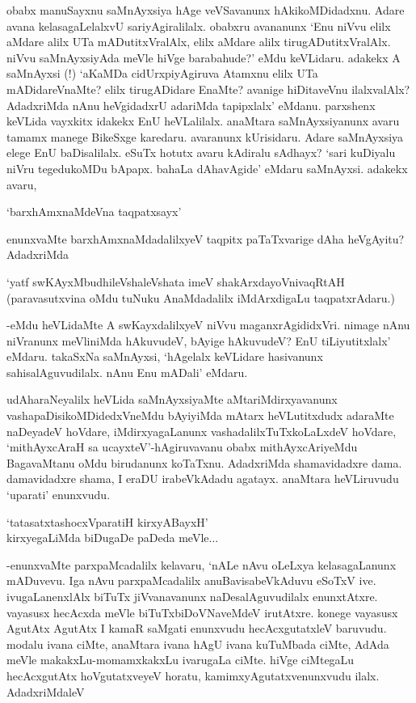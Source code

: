 obabx manuSayxnu saMnAyxsiya hAge veVSavanunx hAkikoMDidadxnu. Adare avana kelasagaLelalxvU sariyAgiralilalx. obabxru avananunx `Enu niVvu elilx aMdare alilx UTa mADutitxVralAlx, elilx aMdare alilx tirugADutitxVralAlx. niVvu saMnAyxsiyAda meVle hiVge barabahude?' eMdu keVLidaru. adakekx A saMnAyxsi (!) `aKaMDa cidUrxpiyAgiruva Atamxnu elilx UTa mADidareVnaMte? elilx tirugADidare EnaMte? avanige hiDitaveVnu ilalxvalAlx? AdadxriMda nAnu heVgidadxrU adariMda tapipxlalx' eMdanu. parxshenx keVLida vayxkitx idakekx EnU heVLalilalx. anaMtara saMnAyxsiyanunx avaru tamamx manege BikeSxge karedaru. avaranunx kUrisidaru. Adare saMnAyxsiya elege EnU baDisalilalx. eSuTx hotutx avaru kAdiralu sAdhayx? `sari kuDiyalu niVru tegedukoMDu bApapx. bahaLa dAhavAgide' eMdaru saMnAyxsi. adakekx avaru,

\begin{shloka}
`barxhAmxnaMdeVna taqpatxsayx'
\end{shloka}

enunxvaMte barxhAmxnaMdadalilxyeV taqpitx paTaTxvarige dAha heVgAyitu? AdadxriMda

\begin{shloka}
`yatf swKAyxMbudhileVshaleVshata imeV shakArxdayoVnivaqRtAH\\
(paravasutxvina oMdu tuNuku AnaMdadalilx iMdArxdigaLu taqpatxrAdaru.)
\end{shloka}

-eMdu heVLidaMte A swKayxdalilxyeV niVvu maganxrAgididxVri. nimage nAnu niVranunx meVliniMda hAkuvudeV, bAyige hAkuvudeV? EnU tiLiyutitxlalx' eMdaru. takaSxNa saMnAyxsi, `hAgelalx keVLidare hasivanunx sahisalAguvudilalx. nAnu Enu mADali' eMdaru.

udAharaNeyalilx heVLida saMnAyxsiyaMte aMtariMdirxyavanunx vashapaDisikoMDidedxVneMdu bAyiyiMda mAtarx heVLutitxdudx adaraMte naDeyadeV hoVdare, iMdirxyagaLanunx vashadalilxTuTxkoLaLxdeV hoVdare, `mithAyxcAraH sa ucayxteV'-hAgiruvavanu obabx mithAyxcAriyeMdu BagavaMtanu oMdu birudanunx koTaTxnu. AdadxriMda shamavidadxre dama. damavidadxre shama, I eraDU irabeVkAdadu agatayx. anaMtara heVLiruvudu `uparati' enunxvudu.

\begin{shloka}
`tatasatxtashocxVparatiH kirxyABayxH'\\
kirxyegaLiMda biDugaDe paDeda meVle$\ldots$ 
\end{shloka}

-enunxvaMte parxpaMcadalilx kelavaru, `nALe nAvu oLeLxya kelasagaLanunx mADuvevu. Iga nAvu parxpaMcadalilx anuBavisabeVkAduvu eSoTxV ive. ivugaLanenxlAlx biTuTx jiVvanavanunx naDesalAguvudilalx enunxtAtxre. vayasusx hecAcxda meVle biTuTxbiDoVNaveMdeV irutAtxre. konege vayasusx AgutAtx AgutAtx I kamaR saMgati enunxvudu hecAcxgutatxleV baruvudu. modalu ivana ciMte, anaMtara ivana hAgU ivana kuTuMbada ciMte, AdAda meVle makakxLu-momamxkakxLu ivarugaLa ciMte. hiVge ciMtegaLu hecAcxgutAtx hoVgutatxveyeV horatu, kamimxyAgutatxvenunxvudu ilalx. AdadxriMdaleV

